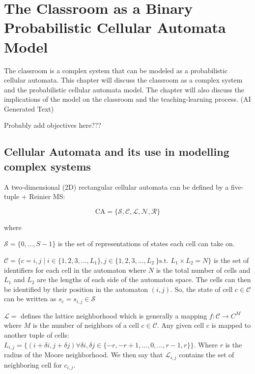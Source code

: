 \chapter{The Classroom as a Binary Probabilistic Cellular Automata Model}
\hspace{\parindent} The classroom is a complex system that can be modeled as a probabilistic cellular automata. This chapter will discuss the classroom as a complex system and the probabilistic cellular automata model. The chapter will also discuss the implications of the model on the classroom and the teaching-learning process. (AI Generated Text)

Probably add objectives here???

\section{Cellular Automata and its use in modelling complex systems}

A two-dimensional (2D) rectangular cellular automata can be defined by a five-tuple \cite{arciaga2009experimental} + Reinier MS:

\begin{equation}
    \label{eq:CA definition}
    \text{CA} = \lbrace \mathcal{S,C,L,N,R} \rbrace
\end{equation}

where

$\mathcal{S} = \lbrace 0,...,S-1 \rbrace$ is the set of representations of states each cell can take on.

$\mathcal{C} = \lbrace c = {i,j} \mid i \in \lbrace 1,2,3,\dots,L_1 \rbrace, j \in \lbrace 1,2,3,\dots,L_2\ \rbrace \text{s.t. } L_1 \times L_2 = N \rbrace$ is the set of identifiers for each cell in the automaton where $N$ is the total number of cells and $L_1$ and $L_2$ are the lengths of each side of the automaton space. The cells can then be identified by their position in the automaton $(i,j)$. So, the state of cell $c \in \mathcal{C}$ can be written as $s_c = s_{i,j} \in \mathcal{S}$

$\mathcal{L} =$ defines the lattice neighborhood which is generally a mapping $f : \mathcal{C} \rightarrow C^M$ where $M$ is the number of neighbors of a cell $c \in \mathcal{C}$. Any given cell $c$ is mapped to another tuple of cells: $L_{i,j} = \lbrace (i + \delta i, j + \delta j) \forall \delta i, \delta j \in \lbrace -r, -r+1, \dots, 0, \dots, r-1, r \rbrace \rbrace$. Where $r$ is the radius of the Moore neighborhood. We then say that $\mathcal{L}_{i,j}$ contains the set of neighboring cell for $c_{i,j}$.

